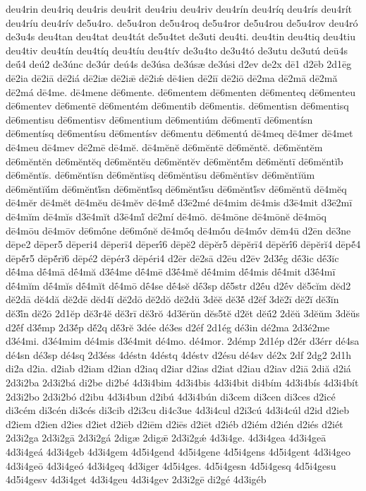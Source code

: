 {deu4rin
deu4riq
deu4ris
deu4rit
deu4riu
deu4riv
deu4rín
deu4ríq
deu4rís
deu4rít
deu4ríu
deu4rív
de5u4ro.
de5u4ron
de5u4roq
de5u4ror
de5u4rou
de5u4rov
deu4ró
de3u4s
deu4tan
deu4tat
deu4tát
de5u4tet
de3uti
deu4ti.
deu4tin
deu4tiq
deu4tiu
deu4tiv
deu4tín
deu4tíq
deu4tíu
deu4tív
de3u4to
de3u4tó
de3utu
de3utú
deū4s
deū́4
deú2
de3únc
de3úr
deú4s
de3úsa
de3úsæ
de3úsi
d2ev
de2x
dē1
d2ēb
2d1ēg
dē2ia
dē2iā
dē2iá
dē2iæ
dē2iǣ
dē2iǽ
dē4ien
dē2iī
dē2iō
dē2ma
dē2mā
dē2mă
dē2má
dē4me.
dē4mene
dē6mente.
dē6mentem
dē6menten
dē6menteq
dē6menteu
dē6mentev
dē6mentē
dē6mentém
dē6mentib
dē6mentis.
dē6mentisn
dē6mentisq
dē6mentisu
dē6mentisv
dē6mentium
dē6mentiúm
dē6mentī
dē6mentísn
dē6mentísq
dē6mentísu
dē6mentísv
dē6mentu
dē6mentú
dē4meq
dē4mer
dē4met
dē4meu
dē4mev
dē2mē
dē4mĕ.
dē4mĕnĕ
dē6mĕntē
dē6mĕntĕ.
dē6mĕntĕm
dē6mĕntĕn
dē6mĕntĕq
dē6mĕntĕu
dē6mĕntĕv
dē6mĕntĕ́m
dē6mĕntī
dē6mĕntĭb
dē6mĕntĭs.
dē6mĕntĭsn
dē6mĕntĭsq
dē6mĕntĭsu
dē6mĕntĭsv
dē6mĕntĭŭm
dē6mĕntĭŭ́m
dē6mĕntĭ́sn
dē6mĕntĭ́sq
dē6mĕntĭ́su
dē6mĕntĭ́sv
dē6mĕntŭ
dē4mĕq
dē4mĕr
dē4mĕt
dē4mĕu
dē4mĕv
dē4mĕ́
d3ē2mé
dē4mim
dē4mis
d3ē4mit
d3ē2mī
dē4mĭm
dē4mĭs
d3ē4mĭt
d3ē4mĭ́
dē2mí
dē4mō.
dē4mōne
dē4mōnĕ
dē4mōq
dē4mōu
dē4mōv
dē6mṓne
dē6mṓnĕ
dē4mṓq
dē4mṓu
dē4mṓv
dēm4ū
d2ēn
dē3ne
dēpe2
dēper5
dēperi4
dēperī4
dēperī́6
dēpĕ2
dēpĕr5
dēpĕrī4
dēpĕrī́6
dēpĕrĭ4
dēpĕ́4
dēpĕ́r5
dēpĕ́rĭ6
dēpé2
dēpér3
dēpéri4
d2ēr
dē2sā
d2ēu
d2ēv
2d3ḗg
dḗ3ic
dḗ3ĭc
dḗ4ma
dḗ4mā
dḗ4mă
d3ḗ4me
dḗ4mē
d3ḗ4mĕ
dḗ4mim
dḗ4mis
dḗ4mit
d3ḗ4mī
dḗ4mĭm
dḗ4mĭs
dḗ4mĭt
dḗ4mō
dḗ4se
dḗ4sĕ
dḗ3sp
dḗ5str
d2ḗu
d2ḗv
dĕ5cĭm
dĕd2
dĕ2dā
dĕ4dă
dĕ2dē
dĕd4ĭ
dĕ2dō
dĕ2dŏ
dĕ2dŭ
3dĕĕ
dĕ3ĕ́
d2ĕf
3dĕ2ī
dĕ2ĭ
dĕ3ĭn
dĕ3ĭ́n
dĕ2ō
2d1ĕp
dĕ3r4ĕ
dĕ3rī
dĕ3rŏ
4d3ĕrŭn
dĕs5tĕ
d2ĕt
dĕū́2
2dĕŭ
3dĕŭm
3dĕŭs
d2ĕ́f
d3ĕ́mp
2d3ĕ́p
dĕ́2q
dĕ́3rĕ
3dée
dé3es
d2éf
2d1ég
dé3in
dé2ma
2d3é2me
d3é4mi.
d3é4mim
dé4mis
d3é4mit
dé4mo.
dé4mor.
2démp
2d1ép
d2ér
d3érr
dé4sa
dé4sn
dé3sp
dé4sq
2d3éss
4déstn
4déstq
4déstv
d2ésu
dé4sv
dé2x
2df
2dg2
2d1h
di2a
d2ia.
d2iab
d2iam
d2ian
d2iaq
d2iar
d2ias
d2iat
d2iau
d2iav
d2iā
2diă
d2iá
2d3i2ba
2d3i2bá
di2be
di2bé
4d3i4bim
4d3i4bis
4d3i4bit
di4bím
4d3i4bís
4d3i4bít
2d3i2bo
2d3i2bó
d2ibu
4d3i4bun
d2ibú
4d3i4bún
di3cem
di3cen
di3ces
d2icé
di3cém
di3cén
di3cés
di3cib
d2i3cu
di4c3ue
4d3i4cul
d2i3cú
4d3i4cúl
d2id
d2ieb
d2iem
d2ien
d2ies
d2iet
d2iēb
d2iēm
d2iēs
d2iēt
d2iéb
d2iém
d2ién
d2iés
d2iét
2d3i2ga
2d3i2gā
2d3i2gá
2digæ
2digǣ
2d3i2gǽ
4d3i4ge.
4d3i4gea
4d3i4geā
4d3i4geá
4d3i4geb
4d3i4gem
4d5i4gend
4d5i4gene
4d5i4gens
4d5i4gent
4d3i4geo
4d3i4geō
4d3i4geó
4d3i4geq
4d3iger
4d5i4ges.
4d5i4gesn
4d5i4gesq
4d5i4gesu
4d5i4gesv
4d3i4get
4d3i4geu
4d3i4gev
2d3i2gē
di2gé
4d3igéb
}
